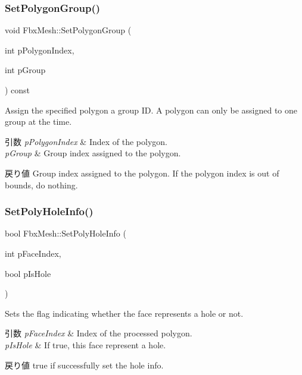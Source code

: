 \subsubsection{\texorpdfstring{Set\+Polygon\+Group()}{SetPolygonGroup()}}
{\footnotesize\ttfamily void Fbx\+Mesh\+::\+Set\+Polygon\+Group (\begin{DoxyParamCaption}\item[{int}]{p\+Polygon\+Index,  }\item[{int}]{p\+Group }\end{DoxyParamCaption}) const}

Assign the specified polygon a group ID. A polygon can only be assigned to one group at the time. 
\begin{DoxyParams}{引数}
{\em p\+Polygon\+Index} & Index of the polygon. \\
\hline
{\em p\+Group} & Group index assigned to the polygon. \\
\hline
\end{DoxyParams}
\begin{DoxyReturn}{戻り値}
Group index assigned to the polygon. If the polygon index is out of bounds, do nothing. 
\end{DoxyReturn}
\mbox{\label{class_fbx_mesh_af13ce6ba20ce1920120a8b7b6d6854ed}} 
\subsubsection{\texorpdfstring{Set\+Poly\+Hole\+Info()}{SetPolyHoleInfo()}}
{\footnotesize\ttfamily bool Fbx\+Mesh\+::\+Set\+Poly\+Hole\+Info (\begin{DoxyParamCaption}\item[{int}]{p\+Face\+Index,  }\item[{bool}]{p\+Is\+Hole }\end{DoxyParamCaption})}

Sets the flag indicating whether the face represents a hole or not. 
\begin{DoxyParams}{引数}
{\em p\+Face\+Index} & Index of the processed polygon. \\
\hline
{\em p\+Is\+Hole} & If {\ttfamily true}, this face represent a hole. \\
\hline
\end{DoxyParams}
\begin{DoxyReturn}{戻り値}
{\ttfamily true} if successfully set the hole info. 
\end{DoxyReturn}
\mbox{\label{class_fbx_mesh_ae1392c998ffe508d66284c5615b17f15}} 
